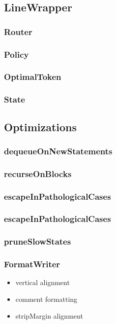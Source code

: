 \subsection{LineWrapper}
\subsubsection{Router}\label{sec:router}
\subsubsection{Policy}\label{sec:policy}
\subsubsection{OptimalToken}\label{sec:optimal}
\subsubsection{State}
\subsection{Optimizations}
\subsubsection{dequeueOnNewStatements}
\subsubsection{recurseOnBlocks}
\subsubsection{escapeInPathologicalCases}
\subsubsection{escapeInPathologicalCases}
\subsubsection{pruneSlowStates}
\subsubsection{FormatWriter}
\begin{itemize}
  \item vertical alignment
  \item comment formatting
  \item stripMargin alignment
\end{itemize}
